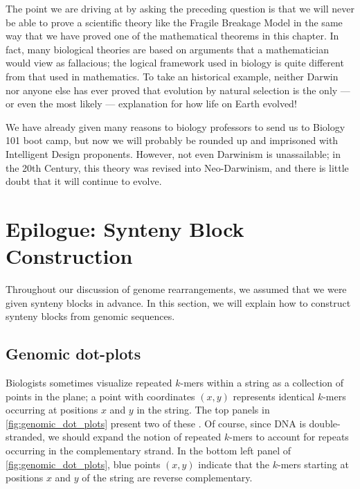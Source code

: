 \begin{qbox}\end{qbox}

\noindent The point we are driving at by asking the preceding question is that we will never be able to prove a scientific theory like the Fragile Breakage Model in the same way that we have proved one of the mathematical theorems in this chapter. In fact, many biological theories are based on arguments that a mathematician would view as fallacious; the logical framework used in biology is quite different from that used in mathematics. To take an historical example, neither Darwin nor anyone else has ever proved that evolution by natural selection is the only --- or even the most likely --- explanation for how life on Earth evolved!

We have already given many reasons to biology professors to send us to Biology 101 boot camp, but now we will probably be rounded up and imprisoned with Intelligent Design proponents. However, not even Darwinism is unassailable; in the 20th Century, this theory was revised into Neo-Darwinism, and there is little doubt that it will continue to evolve.\\

\FloatBarrier
\section{Epilogue: Synteny Block Construction}
\label{sec:synteny_block_construction}

Throughout our discussion of genome rearrangements, we assumed that we were given synteny blocks in advance.  In this section, we will explain how to construct synteny blocks from genomic sequences.

\subsection{Genomic dot-plots}
\label{subsec:genomic_dot-plots}

Biologists sometimes visualize repeated $k$-mers within a string as a collection of points in the plane; a point with coordinates $(x,y)$ represents identical $k$-mers occurring at positions $x$ and $y$ in the string.  The top panels in \autoref{fig:genomic_dot_plots} present two of these .  Of course, since DNA is double-stranded, we should expand the notion of repeated $k$-mers to account for repeats occurring in the complementary strand. In the bottom left panel of \autoref{fig:genomic_dot_plots}, blue points $(x,y)$ indicate that the $k$-mers starting at positions $x$ and $y$ of the string are reverse complementary.

